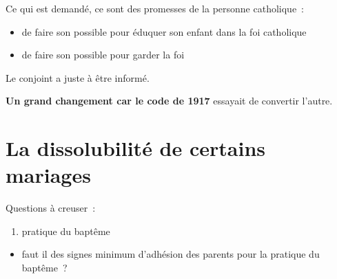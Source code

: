 Ce qui est demandé, ce sont des promesses de la personne catholique~:

\begin{itemize}
\item
  de faire son possible pour éduquer son enfant dans la foi catholique
\item
  de faire son possible pour garder la foi
\end{itemize}

Le conjoint a juste à être informé.

\textbf{Un grand changement car le code de 1917} essayait de convertir
l'autre.

\hypertarget{iv.-la-dissolubilituxe9-de-certains-mariages}{%
\section{La dissolubilité de certains
mariages}\label{iv.-la-dissolubilituxe9-de-certains-mariages}}

 

Questions à creuser~:

\begin{enumerate}
\def\labelenumi{\arabic{enumi}.}
\setcounter{enumi}{5}
\item
  pratique du baptême
\end{enumerate}

\begin{itemize}
\item
   
  faut il des signes minimum d'adhésion des parents pour la pratique du
  baptême~?
   
\end{itemize}

